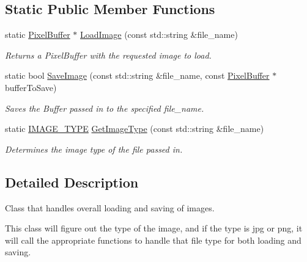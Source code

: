 \subsection*{Static Public Member Functions}
\begin{DoxyCompactItemize}
\item 
static \hyperlink{classimage__tools_1_1PixelBuffer}{Pixel\+Buffer} $\ast$ \hyperlink{classImageHandler_aa690d376fd45e01d24d1b45a67fab1a2}{Load\+Image} (const std\+::string \&file\+\_\+name)\hypertarget{classImageHandler_aa690d376fd45e01d24d1b45a67fab1a2}{}\label{classImageHandler_aa690d376fd45e01d24d1b45a67fab1a2}

\begin{DoxyCompactList}\small\item\em Returns a Pixel\+Buffer with the requested image to load. \end{DoxyCompactList}\item 
static bool \hyperlink{classImageHandler_a85de409a4a1cf53c8ada21a217948504}{Save\+Image} (const std\+::string \&file\+\_\+name, const \hyperlink{classimage__tools_1_1PixelBuffer}{Pixel\+Buffer} $\ast$buffer\+To\+Save)\hypertarget{classImageHandler_a85de409a4a1cf53c8ada21a217948504}{}\label{classImageHandler_a85de409a4a1cf53c8ada21a217948504}

\begin{DoxyCompactList}\small\item\em Saves the Buffer passed in to the specified file\+\_\+name. \end{DoxyCompactList}\item 
static \hyperlink{classImageHandler_ade489694bd1fd4a2200e93f39d0efe83}{I\+M\+A\+G\+E\+\_\+\+T\+Y\+PE} \hyperlink{classImageHandler_a4e7f2a3f5ecbc60ac28755447b8647d7}{Get\+Image\+Type} (const std\+::string \&file\+\_\+name)
\begin{DoxyCompactList}\small\item\em Determines the image type of the file passed in. \end{DoxyCompactList}\end{DoxyCompactItemize}


\subsection{Detailed Description}
Class that handles overall loading and saving of images. 

This class will figure out the type of the image, and if the type is jpg or png, it will call the appropriate functions to handle that file type for both loading and saving. 

